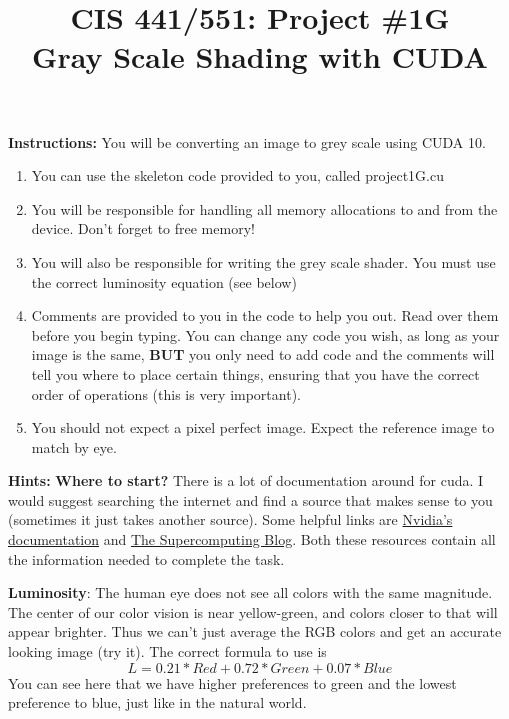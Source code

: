 \documentclass[12pt,letter]{article}
\begin{document}
\title{CIS 441/551: Project \#1G\\
       \large Gray Scale Shading with CUDA}
\date{}
\maketitle

\large{\textbf{Instructions:}}
You will be converting an image to grey scale using CUDA 10.
\begin{enumerate}
    \item You can use the skeleton code provided to you, called project1G.cu
    \item You will be responsible for handling all memory allocations to and 
          from the device. Don't forget to free memory!
    \item You will also be responsible for writing the grey scale shader. You
          must use the correct luminosity equation (see below)
    \item Comments are provided to you in the code to help you out. Read over
          them before you begin typing. You can change any code you wish, as
          long as your image is the same, \textbf{BUT} you only need to add
          code and the comments will tell you where to place certain things,
          ensuring that you have the correct order of operations (this is
          very important).
    \item You should not expect a pixel perfect image. Expect the reference
          image to match by eye. 
\end{enumerate}

\large{\textbf{Hints:}}
\textbf{Where to start?} There is a lot of documentation around for cuda. I 
would suggest searching the internet and find a source that makes sense to you
(sometimes it just takes another source). Some helpful links are 
\href{https://www.nvidia.com/docs/IO/116711/sc11-cuda-c-basics.pdf}{Nvidia's
documentation} and 
\href{http://supercomputingblog.com/cuda/cuda-tutorial-1-getting-started/}
{The Supercomputing Blog}. Both these resources contain all the information
needed to complete the task. 


\textbf{Luminosity}: The human eye does not see all colors with the same 
magnitude. The center of our color vision is near yellow-green, and colors
closer to that will appear brighter. Thus we can't just average the RGB colors
and get an accurate looking image (try it). The correct formula to use is
\begin{equation}
    L = 0.21 * Red + 0.72 * Green + 0.07 * Blue
\end{equation}
You can see here that we have higher preferences to green and the lowest 
preference to blue, just like in the natural world. 
\end{document}
